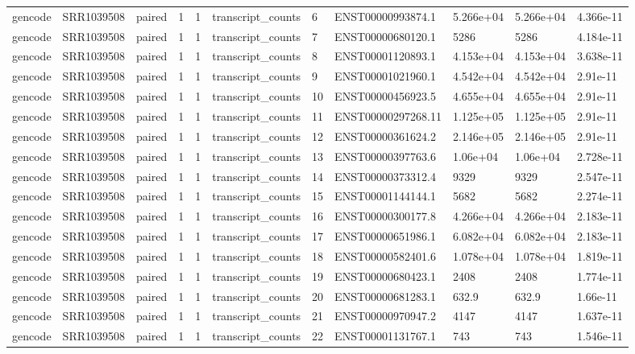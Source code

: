 \begin{tabular}{lllllllllll}
gencode & SRR1039508 & paired & 1 & 1 & transcript\_counts & 6 & ENST00000993874.1 & 5.266e+04 & 5.266e+04 & 4.366e-11 \\
gencode & SRR1039508 & paired & 1 & 1 & transcript\_counts & 7 & ENST00000680120.1 & 5286 & 5286 & 4.184e-11 \\
gencode & SRR1039508 & paired & 1 & 1 & transcript\_counts & 8 & ENST00001120893.1 & 4.153e+04 & 4.153e+04 & 3.638e-11 \\
gencode & SRR1039508 & paired & 1 & 1 & transcript\_counts & 9 & ENST00001021960.1 & 4.542e+04 & 4.542e+04 & 2.91e-11 \\
gencode & SRR1039508 & paired & 1 & 1 & transcript\_counts & 10 & ENST00000456923.5 & 4.655e+04 & 4.655e+04 & 2.91e-11 \\
gencode & SRR1039508 & paired & 1 & 1 & transcript\_counts & 11 & ENST00000297268.11 & 1.125e+05 & 1.125e+05 & 2.91e-11 \\
gencode & SRR1039508 & paired & 1 & 1 & transcript\_counts & 12 & ENST00000361624.2 & 2.146e+05 & 2.146e+05 & 2.91e-11 \\
gencode & SRR1039508 & paired & 1 & 1 & transcript\_counts & 13 & ENST00000397763.6 & 1.06e+04 & 1.06e+04 & 2.728e-11 \\
gencode & SRR1039508 & paired & 1 & 1 & transcript\_counts & 14 & ENST00000373312.4 & 9329 & 9329 & 2.547e-11 \\
gencode & SRR1039508 & paired & 1 & 1 & transcript\_counts & 15 & ENST00001144144.1 & 5682 & 5682 & 2.274e-11 \\
gencode & SRR1039508 & paired & 1 & 1 & transcript\_counts & 16 & ENST00000300177.8 & 4.266e+04 & 4.266e+04 & 2.183e-11 \\
gencode & SRR1039508 & paired & 1 & 1 & transcript\_counts & 17 & ENST00000651986.1 & 6.082e+04 & 6.082e+04 & 2.183e-11 \\
gencode & SRR1039508 & paired & 1 & 1 & transcript\_counts & 18 & ENST00000582401.6 & 1.078e+04 & 1.078e+04 & 1.819e-11 \\
gencode & SRR1039508 & paired & 1 & 1 & transcript\_counts & 19 & ENST00000680423.1 & 2408 & 2408 & 1.774e-11 \\
gencode & SRR1039508 & paired & 1 & 1 & transcript\_counts & 20 & ENST00000681283.1 & 632.9 & 632.9 & 1.66e-11 \\
gencode & SRR1039508 & paired & 1 & 1 & transcript\_counts & 21 & ENST00000970947.2 & 4147 & 4147 & 1.637e-11 \\
gencode & SRR1039508 & paired & 1 & 1 & transcript\_counts & 22 & ENST00001131767.1 & 743 & 743 & 1.546e-11 \\

\end{tabular}
